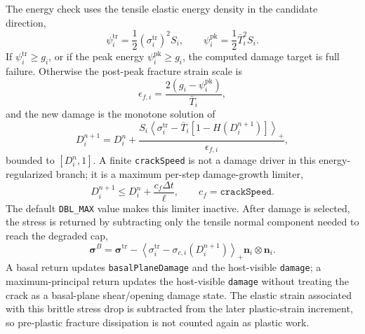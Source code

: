 The energy check uses the tensile elastic energy density in the candidate direction,
\begin{equation}
  \psi_i^{\mathrm{tr}}=\frac{1}{2}\left(\sigma_i^{\mathrm{tr}}\right)^2S_i,
  \qquad
  \psi_i^{\mathrm{pk}}=\frac{1}{2}\bar T_i^2S_i.
  \label{eq:graphite-brittle-energy}
\end{equation}
If \(\psi_i^{\mathrm{tr}}\ge g_i\), or if the peak energy \(\psi_i^{\mathrm{pk}}\ge g_i\), the computed damage target is full failure.  Otherwise the post-peak fracture strain scale is
\begin{equation}
  \epsilon_{f,i}=\frac{2\left(g_i-\psi_i^{\mathrm{pk}}\right)}{\bar T_i},
  \label{eq:graphite-brittle-softening-strain}
\end{equation}
and the new damage is the monotone solution of
\begin{equation}
  D_i^{n+1}=D_i^n+
  \frac{S_i\left\langle\sigma_i^{\mathrm{tr}}-\bar T_i\left[1-H(D_i^{n+1})\right]\right\rangle_+}{\epsilon_{f,i}},
  \label{eq:graphite-brittle-damage-update}
\end{equation}
bounded to \([D_i^n,1]\).  A finite \texttt{crackSpeed} is not a damage driver in this energy-regularized branch; it is a maximum per-step damage-growth limiter,
\begin{equation}
  D_i^{n+1}\le D_i^n + \frac{c_f\Delta t}{\ell},
  \qquad c_f=\texttt{crackSpeed}.
  \label{eq:graphite-crackspeed-limiter}
\end{equation}
The default \texttt{DBL\_MAX} value makes this limiter inactive.  After damage is selected, the stress is returned by subtracting only the tensile normal component needed to reach the degraded cap,
\begin{equation}
  \boldsymbol{\sigma}^{B} = \boldsymbol{\sigma}^{\mathrm{tr}}
  -\left\langle \sigma_i^{\mathrm{tr}}-\sigma_{c,i}(D_i^{n+1})\right\rangle_+
  \mathbf n_i\otimes\mathbf n_i.
  \label{eq:graphite-brittle-stress-return}
\end{equation}
A basal return updates \texttt{basalPlaneDamage} and the host-visible \texttt{damage}; a maximum-principal return updates the host-visible \texttt{damage} without treating the crack as a basal-plane shear/opening damage state.  The elastic strain associated with this brittle stress drop is subtracted from the later plastic-strain increment, so pre-plastic fracture dissipation is not counted again as plastic work.

